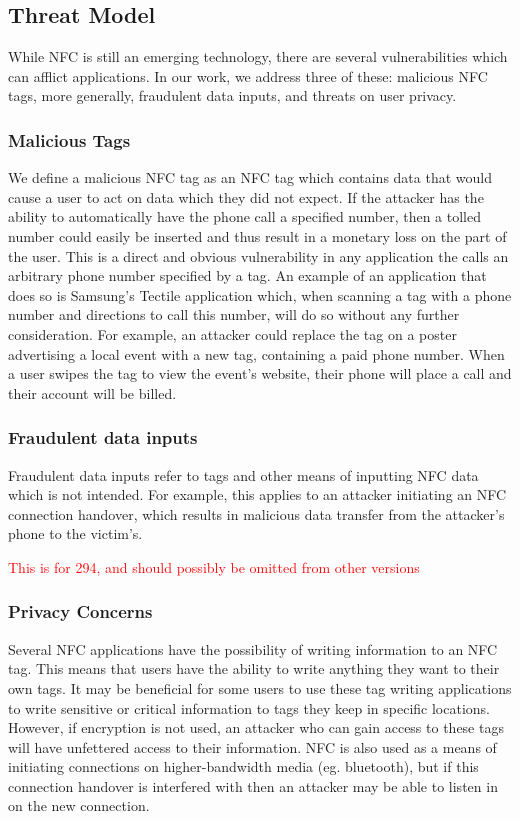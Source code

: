 \documentclass[12pt]{article}
\newcommand\TODO[1]{\textcolor{red}{#1}}
\begin{document}
\subsection{Threat Model}
While NFC is still an emerging technology, there are several vulnerabilities which can afflict applications.
In our work, we address three of these: malicious NFC tags, more generally, fraudulent data inputs, and threats on user privacy.
\subsubsection{Malicious Tags}
We define a malicious NFC tag as an NFC tag which contains data that would cause a user to act on data which they did not expect.
If the attacker has the ability to automatically have the phone call a specified number, then a tolled number could easily be inserted and thus result in a monetary loss on the part of the user. 
This is a direct and obvious vulnerability in any application the calls an arbitrary phone number specified by a tag.
An example of an application that does so is Samsung's Tectile application which, when scanning a tag with a phone number and directions to call this number, will do so without any further consideration. 
For example, an attacker could replace the tag on a poster advertising a local event with a new tag, containing a paid phone number.
When a user swipes the tag to view the event's website, their phone will place a call and their account will be billed.
\subsubsection{Fraudulent data inputs}
Fraudulent data inputs refer to tags and other means of inputting NFC data which is not intended.
For example, this applies to an attacker initiating an NFC connection handover, which results in malicious data transfer from the attacker's phone to the victim's.

\TODO{This is for 294, and should possibly be omitted from other versions}
\subsubsection{Privacy Concerns}
Several NFC applications have the possibility of writing information to an NFC tag.
This means that users have the ability to write anything they want to their own tags.
It may be beneficial for some users to use these tag writing applications to write sensitive or critical information to tags they keep in specific locations.
However, if encryption is not used, an attacker who can gain access to these tags will have unfettered access to their information.
NFC is also used as a means of initiating connections on higher-bandwidth media (eg. bluetooth), but if this connection handover is interfered with then an attacker may be able to listen in on the new connection.
\end{document}
